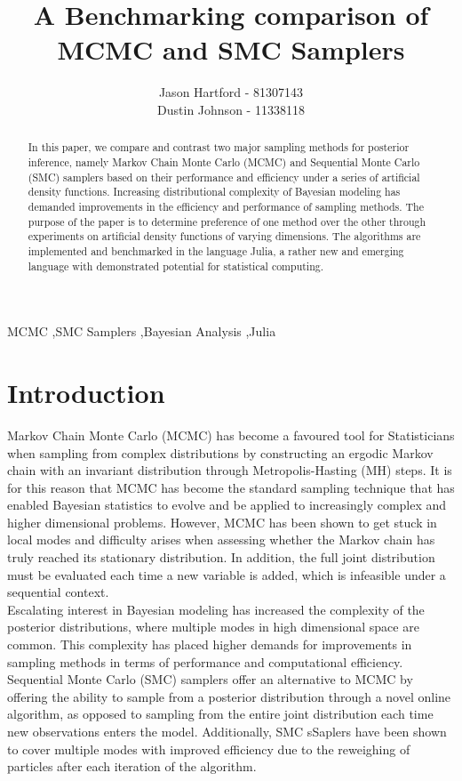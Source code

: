 \documentclass[12pt]{elsarticle}
\begin{document}
	
\begin{frontmatter}
\title{A Benchmarking comparison of MCMC and SMC Samplers}
\author{Jason Hartford - 81307143 \\ Dustin Johnson - 11338118}

\begin{abstract}
In this paper, we compare and contrast two major sampling methods for posterior inference, namely Markov Chain Monte Carlo (MCMC) and Sequential Monte Carlo (SMC) samplers based on their performance and efficiency under a series of artificial density functions. Increasing distributional complexity of Bayesian modeling has demanded improvements in the efficiency and performance of sampling methods.  The purpose of the paper is to determine preference of one method over the other through experiments on artificial density functions of varying dimensions. The algorithms are implemented and benchmarked in the language Julia, a rather new and emerging language with demonstrated potential for statistical computing.
\end{abstract}

\begin{keyword}
MCMC \sep SMC Samplers \sep Bayesian Analysis \sep Julia
\end{keyword}

\end{frontmatter}



\section*{Introduction}
Markov Chain Monte Carlo (MCMC) has become a favoured tool for Statisticians when sampling from complex distributions by constructing an ergodic Markov chain with an invariant distribution through Metropolis-Hasting (MH) steps. It is for this reason that MCMC has become the standard sampling technique that has enabled Bayesian statistics to evolve and be applied to increasingly complex and higher dimensional problems. However, MCMC has been shown to get stuck in local modes and difficulty arises when assessing whether the Markov chain has truly reached its stationary distribution. In addition, the full joint distribution must be evaluated each time a new variable is added, which is infeasible under a sequential context. \\

Escalating interest in Bayesian modeling has increased the complexity of the posterior distributions, where multiple modes in high dimensional space are common. This complexity has placed higher demands for improvements in sampling methods in terms of performance and computational efficiency. Sequential Monte Carlo (SMC) samplers offer an alternative to MCMC by offering the ability to sample from a posterior distribution through a novel online algorithm, as opposed to sampling from the entire joint distribution each time new observations enters the model.  Additionally, SMC sSaplers have been shown to cover multiple modes with improved efficiency due to the reweighing of particles after each iteration of the algorithm. \\
\end{document}
